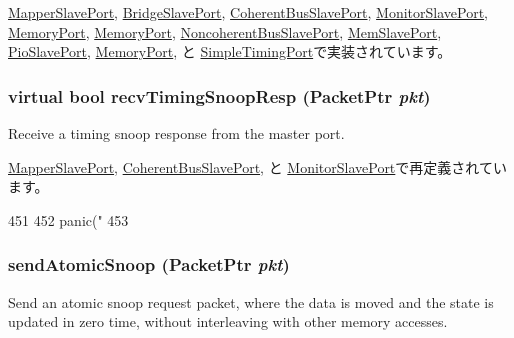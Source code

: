\hyperlink{classAddrMapper_1_1MapperSlavePort_a3344d9dd0f83257feab5424e761f31c6}{MapperSlavePort}, \hyperlink{classBridge_1_1BridgeSlavePort_a3344d9dd0f83257feab5424e761f31c6}{BridgeSlavePort}, \hyperlink{classCoherentBus_1_1CoherentBusSlavePort_ad3786e65574e70ec0a5bd2b0ce311d20}{CoherentBusSlavePort}, \hyperlink{classCommMonitor_1_1MonitorSlavePort_a3344d9dd0f83257feab5424e761f31c6}{MonitorSlavePort}, \hyperlink{classDRAMCtrl_1_1MemoryPort_a8a15a0ae9c080c5f879fc5e791a9e3e7}{MemoryPort}, \hyperlink{classDRAMSim2_1_1MemoryPort_a3344d9dd0f83257feab5424e761f31c6}{MemoryPort}, \hyperlink{classNoncoherentBus_1_1NoncoherentBusSlavePort_ad3786e65574e70ec0a5bd2b0ce311d20}{NoncoherentBusSlavePort}, \hyperlink{classRubyPort_1_1MemSlavePort_a3344d9dd0f83257feab5424e761f31c6}{MemSlavePort}, \hyperlink{classRubyPort_1_1PioSlavePort_a3344d9dd0f83257feab5424e761f31c6}{PioSlavePort}, \hyperlink{classSimpleMemory_1_1MemoryPort_a3344d9dd0f83257feab5424e761f31c6}{MemoryPort}, と \hyperlink{classSimpleTimingPort_a3344d9dd0f83257feab5424e761f31c6}{SimpleTimingPort}で実装されています。\hypertarget{classSlavePort_ae808ca0180bf333d9072270ed66f17fe}{
\subsubsection[{recvTimingSnoopResp}]{\setlength{\rightskip}{0pt plus 5cm}virtual bool recvTimingSnoopResp ({\bf PacketPtr} {\em pkt})}}
\label{classSlavePort_ae808ca0180bf333d9072270ed66f17fe}
Receive a timing snoop response from the master port. 

\hyperlink{classAddrMapper_1_1MapperSlavePort_a9b643d565edc21dac11ce15a560238a7}{MapperSlavePort}, \hyperlink{classCoherentBus_1_1CoherentBusSlavePort_ae808ca0180bf333d9072270ed66f17fe}{CoherentBusSlavePort}, と \hyperlink{classCommMonitor_1_1MonitorSlavePort_a9b643d565edc21dac11ce15a560238a7}{MonitorSlavePort}で再定義されています。


\begin{DoxyCode}
451     {
452         panic("%
453     }
\end{DoxyCode}
\hypertarget{classSlavePort_a4cc4d76bd3aaf333980c232125c8acc8}{
\subsubsection[{sendAtomicSnoop}]{ sendAtomicSnoop ({\bf PacketPtr} {\em pkt})}}
\label{classSlavePort_a4cc4d76bd3aaf333980c232125c8acc8}
Send an atomic snoop request packet, where the data is moved and the state is updated in zero time, without interleaving with other memory accesses.


